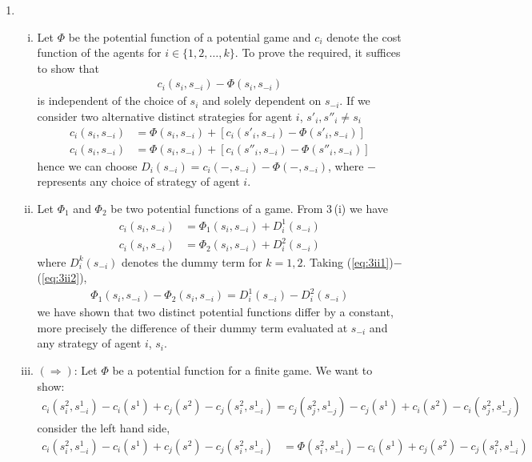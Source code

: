 \documentclass[a4paper,12pt]{article}
\theoremstyle{definition}
\begin{document}
\begin{enumerate}
\item
\begin{enumerate}[(i)]
\item Let $\Phi$ be the potential function of a potential game and $c_i$ denote the cost function of the agents for $i\in \{1,2,\ldots,k\}$. 
To prove the required, it suffices to show that 
\begin{align*}
c_i(s_i,s_{-i})-\Phi(s_i,s_{-i})
\end{align*}
is independent of the choice of $s_i$ and solely dependent on $s_{-i}$. If we consider two alternative distinct strategies for agent $i$, $s'_i, s''_i \neq s_i$
\begin{align*}
c_i(s_i,s_{-i})&=\Phi(s_i,s_{-i})+\left[c_i(s'_i,s_{-i})-\Phi(s'_i,s_{-i})\right]\\
c_i(s_i,s_{-i})&=\Phi(s_i,s_{-i})+\left[c_i(s''_i,s_{-i})-\Phi(s''_i,s_{-i})\right]
\end{align*} 
hence we can choose $D_i(s_{-i})=c_i(-,s_{-i})-\Phi(-,s_{-i})$, where $-$ represents any choice of strategy of agent $i$.

\item Let $\Phi_1$ and $\Phi_2$ be two potential functions of a game. From 3\,(i) we have
\begin{align}
c_i(s_i,s_{-i})&=\Phi_1(s_i,s_{-i})+D^1_i(s_{-i})\label{eq:3ii1}\\
c_i(s_i,s_{-i})&=\Phi_2(s_i,s_{-i})+D^2_i(s_{-i})\label{eq:3ii2}
\end{align}
where $D^k_i(s_{-i})$ denotes the dummy term for $k=1,2$. Taking (\ref{eq:3ii1})$-$(\ref{eq:3ii2}), 
 \begin{align*}
\Phi_1(s_i,s_{-i})-\Phi_2(s_i,s_{-i})=D^1_i(s_{-i})-D^2_i(s_{-i})
\end{align*}
we have shown that two distinct potential functions differ by a constant, more precisely the difference of their dummy term evaluated at $s_{-i}$ and any strategy of agent $i$, $s_i$.

\item
$(\Rightarrow)$: Let $\Phi$ be a potential function for a finite game. We want to show:
\begin{align*}
c_i(s^2_i,s^1_{-i})-c_i(s^1)+c_j(s^2)-c_j(s^2_i,s^1_{-i})=
c_j(s^2_j,s^1_{-j})-c_j(s^1)+c_i(s^2)-c_i(s^2_j,s^1_{-j})
\end{align*}
consider the left hand side,
\begin{align*}
c_i(s^2_i,s^1_{-i})-c_i(s^1)+c_j(s^2)-c_j(s^2_i,s^1_{-i})&=
\Phi(s^2_i,s^1_{-i})-c_i(s^1)+c_j(s^2)-c_j(s^2_i,s^1_{-i})
\end{align*}


\end{enumerate}
\end{enumerate}
\end{document}
